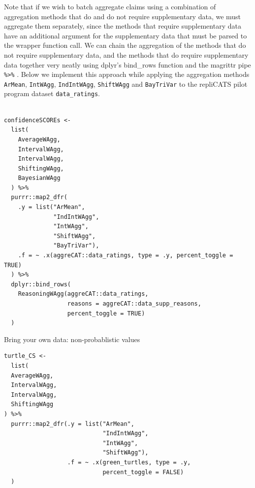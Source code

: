 \documentclass[article]{jss}
\begin{document}
\begin{codelisting}

\caption{Note that if we wish to batch aggregate claims using a
combination of aggregation methods that do and do not require
supplementary data, we must aggregate them separately, since the methods
that require supplementary data have an additional argument for the
supplementary data that must be parsed to the wrapper function call. We
can chain the aggregation of the methods that do not require
supplementary data, and the methods that do require supplementary data
together very neatly using {dplyr}'s {bind\_rows} function
\citep{dplyr2021} and the {magrittr} pipe \texttt{\%\textgreater{}\%}
\citep{magrittr2020}. Below we implement this approach while applying
the aggregation methods \texttt{ArMean}, \texttt{IntWAgg},
\texttt{IndIntWAgg}, \texttt{ShiftWAgg} and \texttt{BayTriVar} to the
repliCATS pilot program dataset \texttt{data\_ratings}.}

\hypertarget{lst-multi-method-workflow-both}{%
\label{lst-multi-method-workflow-both}}%
\begin{verbatim}

confidenceSCOREs <-
  list(
    AverageWAgg,
    IntervalWAgg,
    IntervalWAgg,
    ShiftingWAgg,
    BayesianWAgg
  ) %>%
  purrr::map2_dfr(
    .y = list("ArMean", 
              "IndIntWAgg", 
              "IntWAgg", 
              "ShiftWAgg", 
              "BayTriVar"),
    .f = ~ .x(aggreCAT::data_ratings, type = .y, percent_toggle = TRUE)
  ) %>% 
  dplyr::bind_rows(
    ReasoningWAgg(aggreCAT::data_ratings, 
                  reasons = aggreCAT::data_supp_reasons, 
                  percent_toggle = TRUE)
  )
\end{verbatim}

\end{codelisting}

\begin{codelisting}

\caption{Bring your own data: non-probablistic values}

\hypertarget{lst-BYO-data-aggregate}{%
\label{lst-BYO-data-aggregate}}%
\begin{verbatim}
turtle_CS <- 
  list(
  AverageWAgg,
  IntervalWAgg,
  IntervalWAgg,
  ShiftingWAgg
) %>%
  purrr::map2_dfr(.y = list("ArMean",
                            "IndIntWAgg",
                            "IntWAgg",
                            "ShiftWAgg"),
                  .f = ~ .x(green_turtles, type = .y,
                            percent_toggle = FALSE)
  )
\end{verbatim}

\end{codelisting}
\end{document}
